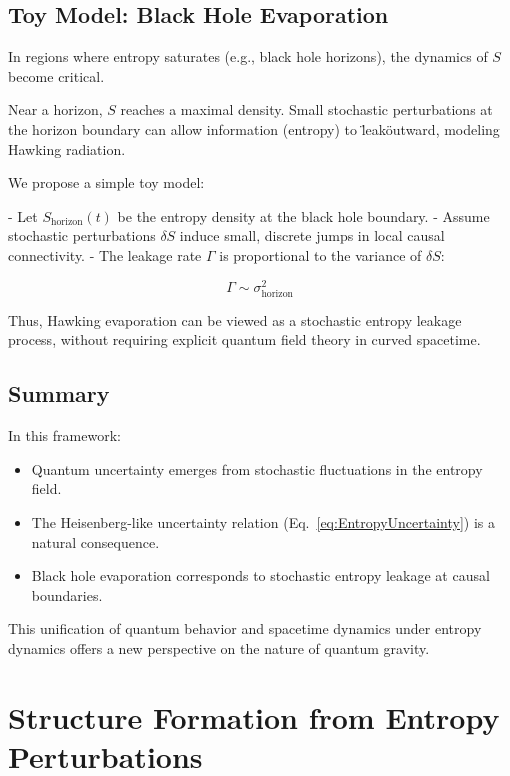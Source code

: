 \documentclass{article}
\begin{document}
\subsection{Toy Model: Black Hole Evaporation}

In regions where entropy saturates (e.g., black hole horizons), the dynamics of $S$ become critical.

Near a horizon, $S$ reaches a maximal density.
Small stochastic perturbations at the horizon boundary can allow information (entropy) to \"leak\" outward, modeling Hawking radiation.

We propose a simple toy model:

- Let $S_{\text{horizon}}(t)$ be the entropy density at the black hole boundary.
- Assume stochastic perturbations $\delta S$ induce small, discrete jumps in local causal connectivity.
- The leakage rate $\Gamma$ is proportional to the variance of $\delta S$:

\begin{equation}
\Gamma \sim \sigma_{\text{horizon}}^2
\end{equation}

Thus, Hawking evaporation can be viewed as a stochastic entropy leakage process, without requiring explicit quantum field theory in curved spacetime.

\subsection{Summary}

In this framework:
\begin{itemize}
    \item Quantum uncertainty emerges from stochastic fluctuations in the entropy field.
    \item The Heisenberg-like uncertainty relation (Eq.~\eqref{eq:EntropyUncertainty}) is a natural consequence.
    \item Black hole evaporation corresponds to stochastic entropy leakage at causal boundaries.
\end{itemize}

This unification of quantum behavior and spacetime dynamics under entropy dynamics offers a new perspective on the nature of quantum gravity.

\section{Structure Formation from Entropy Perturbations}
\end{document}

